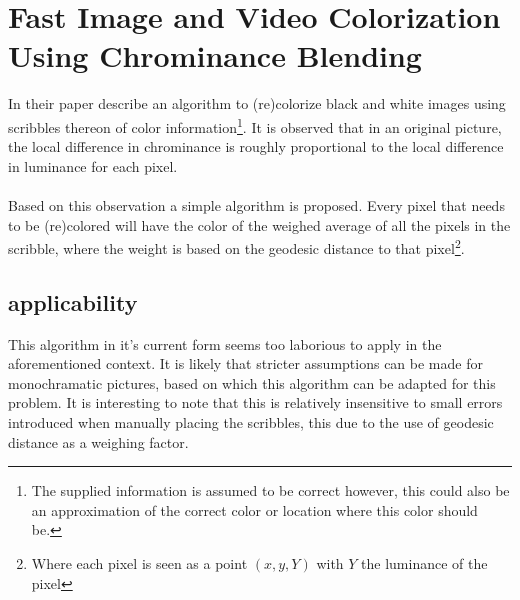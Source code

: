 
\section{Fast Image and Video Colorization Using Chrominance
  Blending}

        In their paper \cite{yatziv2006fast} describe an algorithm to
        (re)colorize black and white images using scribbles thereon of color
        information\footnote{The supplied information is assumed to be correct
        however, this could also be an approximation of the correct color or
        location where this color should be.}. It is observed that in an
        original picture, the local difference in chrominance is roughly
        proportional to the local difference in luminance for each pixel.\\
        \\
        Based on this observation a simple algorithm is proposed. Every pixel
        that needs to be (re)colored will have the color of the weighed
        average of all the pixels in the scribble, where the weight is based
        on the geodesic distance to that pixel\footnote{Where each pixel is
        seen as a point $(x, y, Y)$ with $Y$ the luminance of the
        pixel}.

        \subsection{applicability}
                This algorithm in it's current form seems too
                laborious to apply in the aforementioned context. It
                is likely that stricter assumptions can be made for
                monochramatic pictures, based on which this algorithm
                can be adapted for this problem. It is interesting to
                note that this is relatively insensitive to small
                errors introduced when manually placing the scribbles,
                this due to the use of geodesic distance as a weighing factor.
        